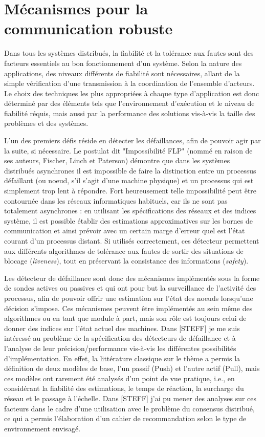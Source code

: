 \documentclass[a4paper]{book}
\begin{document}
\section{Mécanismes pour la communication robuste}
  
Dans tous les systèmes distribués, la fiabilité et la tolérance aux fautes sont des facteurs essentiels au bon fonctionnement d'un système. Selon la nature des applications, des niveaux différents de fiabilité sont nécessaires, allant de la simple vérification d'une transmission à la coordination de l'ensemble d'acteurs. Le choix des techniques les plus appropriées à chaque type d'application est donc déterminé par des éléments tels que l'environnement d'exécution et le niveau de fiabilité réquis, mais aussi par la performance des solutions vis-à-vis la taille des problèmes et des systèmes.

L'un des premiers défis réside en détecter les défaillances, afin de pouvoir agir par la suite, si nécessaire. Le postulat dit "Impossibilité FLP" (nommé en raison de ses auteurs, Fischer, Linch et Paterson) démontre que dans les systèmes distribués asynchrones il est impossible de faire la distinction entre un processus défaillant (ou noeud, s'il s'agit d'une machine physique) et un processus qui est simplement trop lent à répondre. Fort heureusement telle impossibilité peut être contournée dans les réseaux informatiques habituels, car ils ne sont pas totalement asynchrones : en utilisant les spécifications des réseaux et des indices système, il est possible établir des estimations approximatives sur les bornes de communication et ainsi prévoir avec un certain marge d'erreur quel est l'état courant d'un processus distant. Si utilisés correctement, ces détecteur permettent aux différents algorithmes de tolérance aux fautes de sortir des situations de blocage (\textit{liveness}), tout en préservant la consistance des informations (\textit{safety}).

Les détecteur de défaillance sont donc des mécanismes implémentés sous la forme de sondes actives ou passives et qui ont pour but la surveillance de l'activité des processus, afin de pouvoir offrir une estimation sur l'état des noeuds lorsqu'une décision s'impose. Ces mécanismes peuvent être implémentés au sein même des algorithmes ou en tant que module à part, mais son rôle est toujours celui de donner des indices sur l'état actuel des machines. Dans [STEFF] je me suis intéressé au problème de la spécification des détecteurs de défaillance et à l'analyse de leur précision/performance vis-à-vis les différentes possibilités d'implémentation. En effet, la littérature classique sur le thème a permis la définition de deux modèles de base, l'un passif (Push) et l'autre actif (Pull), mais ces modèles ont rarement été analysés d'un point de vue pratique, i.e., en considérant la fiabilité des estimations, le temps de réaction, la surcharge du réseau et le passage à l'échelle. Dans [STEFF] j'ai pu mener des analyses sur ces facteurs dans le cadre d'une utilisation avec le problème du consensus distribué, ce qui a permis l'élaboration d'un cahier de recommandation selon le type de environnement envisagé. 
\end{document}
